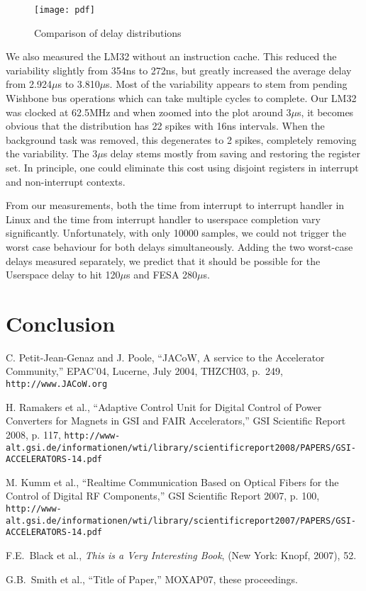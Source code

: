 \documentclass{JAC2003}
\begin{document}
\begin{figure}[t]
   \centering
   \texttt{[image: pdf]}
   \caption{Comparison of delay distributions}
\end{figure}

We also measured the LM32 without an instruction cache.
This reduced the variability slightly from 354ns to 272ns, 
but greatly increased the average delay from 2.924$\mu$s to 3.810$\mu$s.
Most of the variability appears to stem from pending Wishbone bus operations which
can take multiple cycles to complete.
Our LM32 was clocked at 62.5MHz and when zoomed into the plot around 3$\mu$s,
it becomes obvious that the distribution has 22 spikes with 16ns intervals.
When the background task was removed, 
this degenerates to 2 spikes, 
completely removing the variability.
The 3$\mu$s delay stems mostly from saving and restoring the register set.
In principle, one could eliminate this cost using disjoint registers 
in interrupt and non-interrupt contexts.

From our measurements,
both the time from interrupt to interrupt handler in Linux 
and the time from interrupt handler to userspace completion vary significantly.
Unfortunately, with only 10000 samples, 
we could not trigger the worst case behaviour for both delays simultaneously.
Adding the two worst-case delays measured separately,
we predict that it should be possible for the Userspace delay to hit
120$\mu$s and FESA 280$\mu$s.

\section{Conclusion}

\begin{thebibliography}{9}   %

C. Petit-Jean-Genaz and J. Poole, ``JACoW, A service to the Accelerator Community,''
EPAC'04, Lucerne, July 2004, THZCH03,  p.~249, \texttt{http://www.JACoW.org}

H. Ramakers  et al., ``Adaptive Control Unit for Digital Control of Power Converters for Magnets in GSI and FAIR Accelerators,'' GSI Scientific Report 2008, p. 117,
\texttt{http://www-alt.gsi.de/informationen/wti/library/scientificreport2008/PAPERS/GSI-ACCELERATORS-14.pdf}

M. Kumm  et al., ``Realtime Communication Based on Optical Fibers for the Control of Digital RF Components,'' GSI Scientific Report 2007, p. 100,
\texttt{http://www-alt.gsi.de/informationen/wti/library/scientificreport2007/PAPERS/GSI-ACCELERATORS-14.pdf}



F.E.~Black et al., {\it This is a Very Interesting Book}, (New York: Knopf, 2007), 52.

G.B.~Smith et al., ``Title of Paper,'' MOXAP07, these proceedings.
\end{thebibliography}
\end{document}
